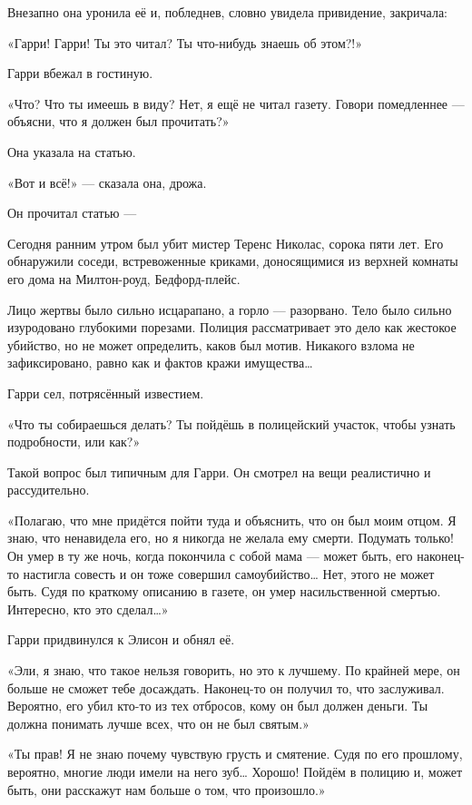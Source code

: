 \documentclass[a5paper, 9pt,
final, openany, twoside=true]{memoir}
\begin{document}
Внезапно она уронила её и, побледнев, словно увидела привидение, закричала:

«Гарри! Гарри! Ты это читал? Ты что-нибудь знаешь об этом?!»

Гарри вбежал в гостиную.

«Что? Что ты имеешь в виду? Нет, я ещё не читал газету. Говори помедленнее — объясни, что я должен был прочитать?»

Она указала на статью.

«Вот и всё!» — сказала она, дрожа.

Он прочитал статью —\bigskip

Сегодня ранним утром был убит мистер Теренс Николас, сорока пяти лет. Его обнаружили соседи, встревоженные криками, доносящимися из верхней комнаты его дома на Милтон-роуд, Бедфорд-плейс.

Лицо жертвы было сильно исцарапано, а горло — разорвано. Тело было сильно изуродовано глубокими порезами. Полиция рассматривает это дело как жестокое убийство, но не может определить, каков был мотив. Никакого взлома не зафиксировано, равно как и фактов кражи имущества…\bigskip

Гарри сел, потрясённый известием.

«Что ты собираешься делать? Ты пойдёшь в полицейский участок, чтобы узнать подробности, или как?»

Такой вопрос был типичным для Гарри. Он смотрел на вещи реалистично и рассудительно.

«Полагаю, что мне придётся пойти туда и объяснить, что он был моим отцом. Я знаю, что ненавидела его, но я никогда не желала ему смерти. Подумать только! Он умер в ту же ночь, когда покончила с собой мама — может быть, его наконец-то настигла совесть и он тоже совершил самоубийство… Нет, этого не может быть. Судя по краткому описанию в газете, он умер насильственной смертью. Интересно, кто это сделал…»

Гарри придвинулся к Элисон и обнял её.

«Эли, я знаю, что такое нельзя говорить, но это к лучшему. По крайней мере, он больше не сможет тебе досаждать. Наконец-то он получил то, что заслуживал. Вероятно, его убил кто-то из тех отбросов, кому он был должен деньги. Ты должна понимать лучше всех, что он не был святым.»

«Ты прав! Я не знаю почему чувствую грусть и смятение. Судя по его прошлому, вероятно, многие люди имели на него зуб… Хорошо! Пойдём в полицию и, может быть, они расскажут нам больше о том, что произошло.»
\end{document}
